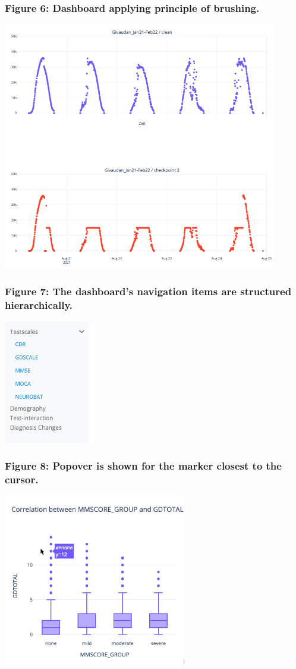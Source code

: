 \documentclass[11pt]{article}
\begin{document}
\subsubsection{Figure 6: Dashboard applying principle of brushing.}
\includegraphics[width=0.9\textwidth]{./dashboard-brushing.png}

\subsubsection{Figure 7: The dashboard's navigation items are structured hierarchically.}
\includegraphics[width=0.3\textwidth]{./menu-collapsible.png}

\subsubsection{Figure 8: Popover is shown for the marker closest to the cursor.}
\includegraphics[width=0.6\textwidth]{./fitts-cursor.png}
\end{document}
